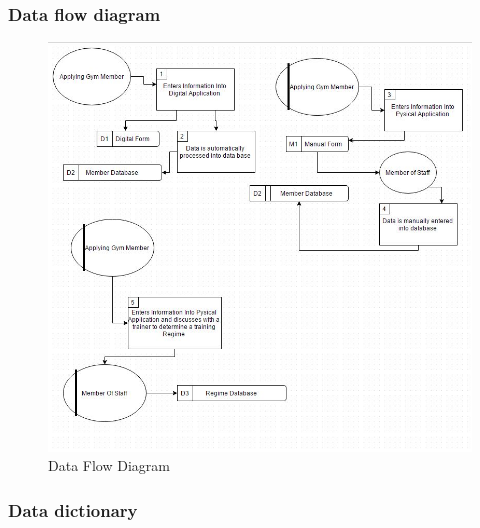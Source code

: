 \subsubsection{Data flow diagram}

\begin{figure}[H]
    \includegraphics[width=\textwidth]{ProposedDFD.JPG}
    \caption{Data Flow Diagram} \label{fig: Data Flow Diagram }
\end{figure}

\subsubsection{Data dictionary}

